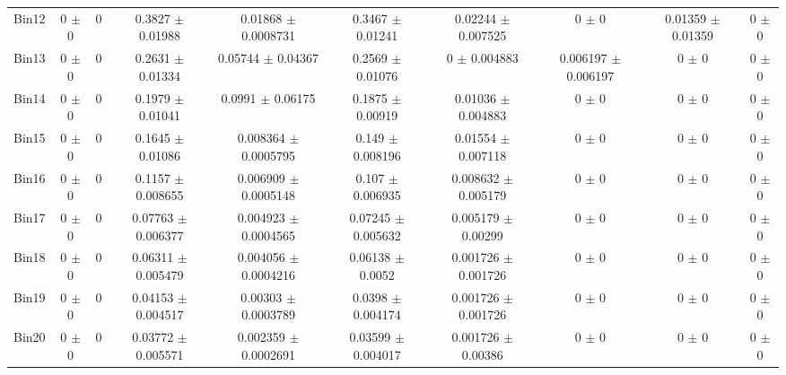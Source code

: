 \begin{tabular}{@{\extracolsep{4pt}}lccccccccc@{}}
     Bin12 & 0 $\pm$ 0 & 0 & 0.3827 $\pm$ 0.01988 & 0.01868 $\pm$ 0.0008731 & 0.3467 $\pm$ 0.01241 & 0.02244 $\pm$ 0.007525 & 0 $\pm$ 0 & 0.01359 $\pm$ 0.01359 & 0 $\pm$ 0 \\ 
     Bin13 & 0 $\pm$ 0 & 0 & 0.2631 $\pm$ 0.01334 & 0.05744 $\pm$ 0.04367 & 0.2569 $\pm$ 0.01076 & 0 $\pm$ 0.004883 & 0.006197 $\pm$ 0.006197 & 0 $\pm$ 0 & 0 $\pm$ 0 \\ 
     Bin14 & 0 $\pm$ 0 & 0 & 0.1979 $\pm$ 0.01041 & 0.0991 $\pm$ 0.06175 & 0.1875 $\pm$ 0.00919 & 0.01036 $\pm$ 0.004883 & 0 $\pm$ 0 & 0 $\pm$ 0 & 0 $\pm$ 0 \\ 
     Bin15 & 0 $\pm$ 0 & 0 & 0.1645 $\pm$ 0.01086 & 0.008364 $\pm$ 0.0005795 & 0.149 $\pm$ 0.008196 & 0.01554 $\pm$ 0.007118 & 0 $\pm$ 0 & 0 $\pm$ 0 & 0 $\pm$ 0 \\ 
     Bin16 & 0 $\pm$ 0 & 0 & 0.1157 $\pm$ 0.008655 & 0.006909 $\pm$ 0.0005148 & 0.107 $\pm$ 0.006935 & 0.008632 $\pm$ 0.005179 & 0 $\pm$ 0 & 0 $\pm$ 0 & 0 $\pm$ 0 \\ 
     Bin17 & 0 $\pm$ 0 & 0 & 0.07763 $\pm$ 0.006377 & 0.004923 $\pm$ 0.0004565 & 0.07245 $\pm$ 0.005632 & 0.005179 $\pm$ 0.00299 & 0 $\pm$ 0 & 0 $\pm$ 0 & 0 $\pm$ 0 \\ 
     Bin18 & 0 $\pm$ 0 & 0 & 0.06311 $\pm$ 0.005479 & 0.004056 $\pm$ 0.0004216 & 0.06138 $\pm$ 0.0052 & 0.001726 $\pm$ 0.001726 & 0 $\pm$ 0 & 0 $\pm$ 0 & 0 $\pm$ 0 \\ 
     Bin19 & 0 $\pm$ 0 & 0 & 0.04153 $\pm$ 0.004517 & 0.00303 $\pm$ 0.0003789 & 0.0398 $\pm$ 0.004174 & 0.001726 $\pm$ 0.001726 & 0 $\pm$ 0 & 0 $\pm$ 0 & 0 $\pm$ 0 \\ 
     Bin20 & 0 $\pm$ 0 & 0 & 0.03772 $\pm$ 0.005571 & 0.002359 $\pm$ 0.0002691 & 0.03599 $\pm$ 0.004017 & 0.001726 $\pm$ 0.00386 & 0 $\pm$ 0 & 0 $\pm$ 0 & 0 $\pm$ 0 \\ 
\hline\hline
  \end{tabular}
